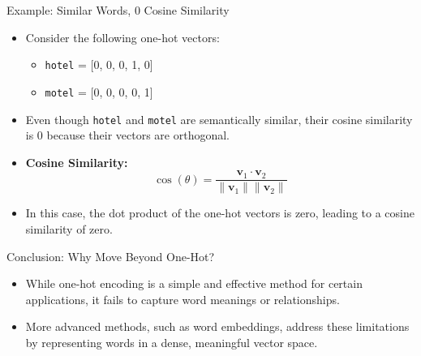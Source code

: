 \documentclass[serif, aspectratio=169]{beamer}
\begin{document}
\begin{frame}{Example: Similar Words, 0 Cosine Similarity}
	\begin{itemize}
		\item Consider the following one-hot vectors:
		\begin{itemize}
			\item \texttt{hotel} = [0, 0, 0, 1, 0]
			\item \texttt{motel} = [0, 0, 0, 0, 1]
		\end{itemize}
		\item Even though \texttt{hotel} and \texttt{motel} are semantically similar, their cosine similarity is 0 because their vectors are orthogonal.
		\item \textbf{Cosine Similarity:}
		\[
		\cos(\theta) = \frac{\mathbf{v}_1 \cdot \mathbf{v}_2}{\|\mathbf{v}_1\| \|\mathbf{v}_2\|}
		\]
		\item In this case, the dot product of the one-hot vectors is zero, leading to a cosine similarity of zero.
	\end{itemize}
\end{frame}

\begin{frame}{Conclusion: Why Move Beyond One-Hot?}
	\begin{itemize}
		\item While one-hot encoding is a simple and effective method for certain applications, it fails to capture word meanings or relationships.
		\item More advanced methods, such as word embeddings, address these limitations by representing words in a dense, meaningful vector space.
	\end{itemize}
\end{frame}



\end{document}
